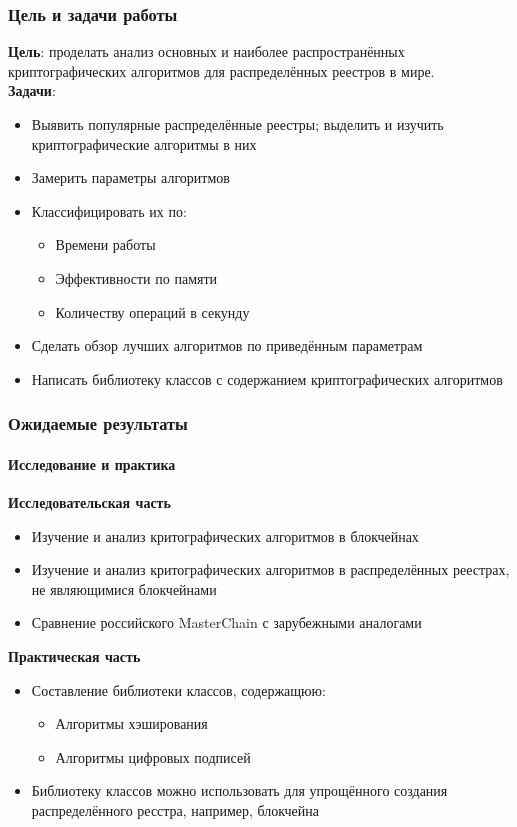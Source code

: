 \documentclass{beamer}
\begin{document}
\begin{frame}
    \frametitle{Цель и задачи работы}
    \textbf{Цель}: проделать анализ основных и наиболее распространённых криптографических алгоритмов для распределённых реестров в мире.\\
    \textbf{Задачи}:
    \begin{itemize}
        \item Выявить популярные распределённые реестры; выделить и изучить
              криптографические алгоритмы в них
        \item Замерить параметры алгоритмов
        \item Классифицировать их по:
        \begin{itemize}
            \item Времени работы
            \item Эффективности по памяти
            \item Количеству операций в секунду
        \end{itemize}
        \item Сделать обзор лучших алгоритмов по приведённым параметрам
        \item Написать библиотеку классов с содержанием криптографических алгоритмов
\end{itemize}
\end{frame}

\begin{frame}
    \frametitle{Ожидаемые результаты}
    \framesubtitle{Исследование и практика}
    \begin{multicols}{2}
        \textbf{Исследовательская часть}
        \begin{itemize}
            \item Изучение и анализ критографических алгоритмов в блокчейнах
            \item Изучение и анализ критографических алгоритмов в
                распределённых реестрах, не являющимися блокчейнами
            \item Сравнение российского MasterChain с зарубежными аналогами
        \end{itemize}
        \bigskip
        \columnbreak
        \textbf{Практическая часть}
        \begin{itemize}
            \item Составление библиотеки классов, содержащюю:
                    \begin{itemize}
                        \item Алгоритмы хэширования
                        \item Алгоритмы цифровых подписей
                    \end{itemize}
            \item Библиотеку классов можно использовать для упрощённого
                  создания распределённого ресстра, например,
                  блокчейна
        \end{itemize}
    \end{multicols}
\end{frame}
\end{document}
